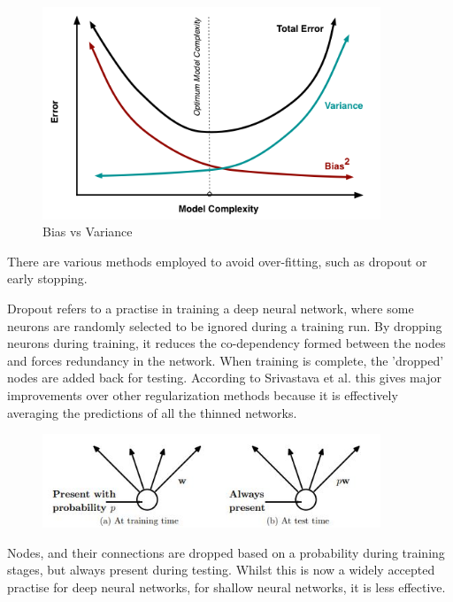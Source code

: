 \begin{figure}[H]
\caption{Bias vs Variance}
\includegraphics[width=0.9\textwidth]{Figures/biasvariance.png}
\end{figure}

There are various methods employed to avoid over-fitting, such as dropout or early stopping.

Dropout refers to a practise in training a deep neural network, where some neurons are randomly selected to be ignored during a training run\cite{Goodfellow_deeplearning}. By dropping neurons during training, it reduces the co-dependency formed between the nodes and forces redundancy in the network\cite{Srivastava_dropout}. When training is complete, the 'dropped' nodes are added back for testing. According to Srivastava et al. this gives major improvements over other regularization methods because it is effectively averaging the predictions of all the thinned networks\cite{Srivastava_dropout}.

\begin{figure}[H]
\includegraphics[width=0.9\textwidth]{Figures/Dropout.JPG}
\end{figure}

Nodes, and their connections are dropped based on a probability during training stages, but always present during testing. Whilst this is now a widely accepted practise for deep neural networks, for shallow neural networks, it is less effective\cite{Srivastava_dropout}.

